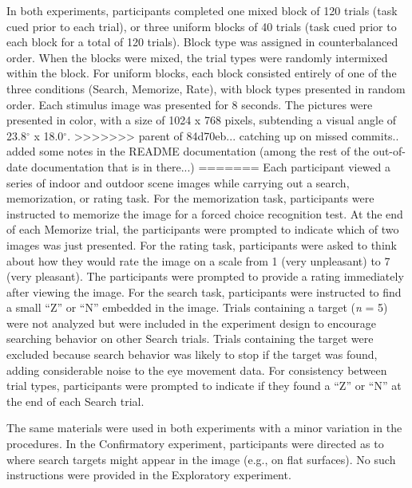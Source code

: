 \documentclass[
  english,
  man, donotrepeattitle,floatsintext]{apa6}
\begin{document}
In both experiments, participants completed one mixed block of 120 trials (task cued prior to each trial), or three uniform blocks of 40 trials (task cued prior to each block for a total of 120 trials). Block type was assigned in counterbalanced order. When the blocks were mixed, the trial types were randomly intermixed within the block. For uniform blocks, each block consisted entirely of one of the three conditions (Search, Memorize, Rate), with block types presented in random order. Each stimulus image was presented for 8 seconds. The pictures were presented in color, with a size of 1024 x 768 pixels, subtending a visual angle of 23.8\(^{\circ}\) x 18.0\(^{\circ}\).
>>>>>>> parent of 84d70eb... catching up on missed commits.. added some notes in the README documentation (among the rest of the out-of-date documentation that is in there...)
=======
Each participant viewed a series of indoor and outdoor scene images while carrying out a search, memorization, or rating task. For the memorization task, participants were instructed to memorize the image for a forced choice recognition test. At the end of each Memorize trial, the participants were prompted to indicate which of two images was just presented. For the rating task, participants were asked to think about how they would rate the image on a scale from 1 (very unpleasant) to 7 (very pleasant). The participants were prompted to provide a rating immediately after viewing the image. For the search task, participants were instructed to find a small \enquote{Z} or \enquote{N} embedded in the image. Trials containing a target (\emph{n} = 5) were not analyzed but were included in the experiment design to encourage searching behavior on other Search trials. Trials containing the target were excluded because search behavior was likely to stop if the target was found, adding considerable noise to the eye movement data. For consistency between trial types, participants were prompted to indicate if they found a \enquote{Z} or \enquote{N} at the end of each Search trial.

The same materials were used in both experiments with a minor variation in the procedures. In the Confirmatory experiment, participants were directed as to where search targets might appear in the image (e.g., on flat surfaces). No such instructions were provided in the Exploratory experiment.
\end{document}
